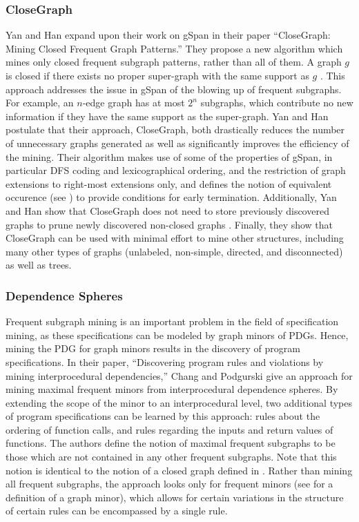 \documentclass[12pt]{article}
\begin{document}
\subsubsection{CloseGraph}
\noindent Yan and Han expand upon their work on gSpan in their paper
``CloseGraph: Mining Closed Frequent Graph Patterns.'' They propose a new
algorithm which mines only closed frequent subgraph patterns, rather than all
of them. A graph $g$ is closed if there exists no proper super-graph with the
same support as $g$ \cite{Yan:2003:CMC:956750.956784}. This approach addresses
the issue in gSpan of the blowing up of frequent subgraphs. For example, an
$n$-edge graph has at most $2^n$ subgraphs, which contribute no new
information if they have the same support as the super-graph. Yan and Han
postulate that their approach, CloseGraph, both drastically reduces the number
of unnecessary graphs generated as well as significantly improves the
efficiency of the mining\cite{Yan:2003:CMC:956750.956784}. Their algorithm
makes use of some of the properties of gSpan, in particular DFS coding and
lexicographical ordering, and the restriction of graph extensions to right-most
extensions only, and defines the notion of equivalent occurence (see
\cite{Yan:2003:CMC:956750.956784}) to provide conditions for early
termination. Additionally, Yan and Han show that CloseGraph does not need to
store previously discovered graphs to prune newly discovered non-closed graphs
\cite{Yan:2003:CMC:956750.956784}. Finally, they show that CloseGraph can be
used with minimal effort to mine other structures, including many other types
of graphs (unlabeled, non-simple, directed, and disconnected) as well as trees.
\\

\subsubsection{Dependence Spheres}
\noindent Frequent subgraph mining is an important problem in the field of
specification mining, as these specifications can be modeled by graph minors
of PDGs. Hence, mining the PDG for graph minors results in the discovery of
program specifications. In their paper, ``Discovering program rules and
violations by mining interprocedural dependencies,''
\cite{DBLP:journals/smr/ChangP12} Chang and Podgurski give an approach for
mining maximal frequent minors from interprocedural dependence spheres. By
extending the scope of the minor to an interprocedural level, two additional
types of program specifications can be learned by this approach: rules about
the ordering of function calls, and rules regarding the inputs and return
values of functions. The authors define the notion of maximal frequent
subgraphs to be those which are not contained in any other frequent subgraphs.
Note that this notion is identical to the notion of a closed graph defined in
\cite{Yan:2003:CMC:956750.956784}. Rather than mining all frequent subgraphs,
the approach looks only for frequent minors (see
\cite{DBLP:journals/smr/ChangP12} for a definition of a graph minor), which
allows for certain variations in the structure of certain rules can be
encompassed by a single rule.
\\
\end{document}
